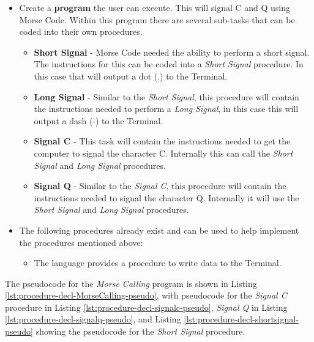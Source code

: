 \begin{itemize}
  \item Create a \textbf{program} the user can execute. This will signal C and Q using Morse Code. Within this program there are several sub-tasks that can be coded into their own procedures.
  \begin{itemize}
    \item \textbf{Short Signal} - Morse Code needed the ability to perform a short signal. The instructions for this can be coded into a \emph{Short Signal} procedure. In this case that will output a dot (.) to the Terminal.
    \item \textbf{Long Signal} - Similar to the \emph{Short Signal}, this procedure will contain the instructions needed to perform a \emph{Long Signal}, in this case this will output a dash (-) to the Terminal.
    \item \textbf{Signal C} - This task will contain the instructions needed to get the computer to signal the character C. Internally this can call the \emph{Short Signal} and \emph{Long Signal} procedures.
    \item \textbf{Signal Q} - Similar to the \emph{Signal C}, this procedure will contain the instructions needed to signal the character Q. Internally it will use the \emph{Short Signal} and \emph{Long Signal} procedures.
  \end{itemize}
  \item The following procedures already exist and can be used to help implement the procedures mentioned above:
  \begin{itemize}
    \item The language provides a procedure to write data to the Terminal.
  \end{itemize}
\end{itemize}


The pseudocode for the \emph{Morse Calling} program is shown in Listing \ref{lst:procedure-decl-MorseCalling-pseudo}, with pseudocode for the \emph{Signal C} procedure in Listing \ref{lst:procedure-decl-signalc-pseudo}, \emph{Signal Q} in Listing \ref{lst:procedure-decl-signalq-pseudo}, and Listing \ref{lst:procedure-decl-shortsignal-pseudo} showing the pseudocode for the \emph{Short Signal} procedure.

